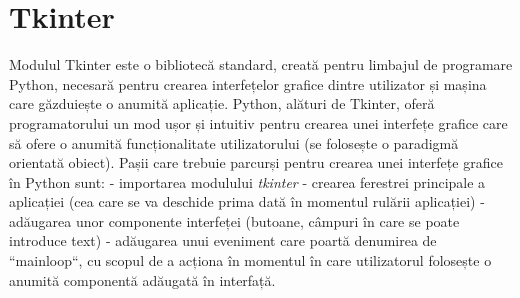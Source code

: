 \documentclass[a4paper,12pt]{report}
\newcommand\tab[1][1cm]{\hspace*{#1}}
\begin{document}
\section{Tkinter}
\tab Modulul Tkinter este o bibliotecă standard, creată pentru limbajul de programare Python, necesară pentru crearea interfețelor grafice dintre utilizator și mașina care 
găzduiește o anumită aplicație.  Python, alături de Tkinter, oferă programatorului un mod ușor și intuitiv pentru crearea unei interfețe grafice care să ofere o anumită 
funcționalitate utilizatorului (se folosește o paradigmă orientată obiect). 
\newline\tab Pașii care trebuie parcurși pentru crearea unei interfețe grafice în Python sunt:
\newline - importarea modulului \textit {tkinter}
\newline - crearea ferestrei principale a aplicației (cea care se va deschide prima dată în momentul rulării aplicației)
\newline - adăugarea unor componente interfeței (butoane, câmpuri în care se poate introduce text)
\newline - adăugarea unui eveniment care poartă denumirea de ``mainloop``, cu scopul de a acționa în momentul în care utilizatorul folosește o anumită componentă adăugată în interfață.
\end{document}
